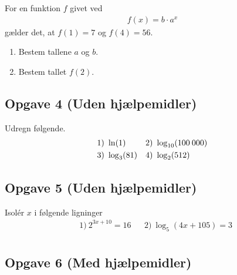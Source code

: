 \documentclass[12pt]{article}
\begin{document}
For en funktion $f$ givet ved 
\begin{align*}
	f(x) = b\cdot a^x
\end{align*}
gælder det, at $f(1) = 7$ og $f(4) = 56$.
\begin{enumerate}[label=\roman*)]
	\item Bestem tallene $a$ og $b$. 
	\item Bestem tallet $f(2)$.
\end{enumerate}

\subsection*{Opgave 4 (Uden hjælpemidler)}

Udregn følgende.
\begin{align*}
	&1) \   \ln(1)  &  &2) \ \log_{10}(100\hspace{0.8mm} 000)\\
	&3) \ \log_3(81)  &  &4) \ \log_{2}(512) 
\end{align*}

\subsection*{Opgave 5 (Uden hjælpemidler)}

Isolér $x$ i følgende ligninger
\begin{align*}
	&1) \ 2^{3x + 10} = 16 &&2) \ \log_5(4x + 105) = 3 \\
\end{align*}
\subsection*{Opgave 6 (Med hjælpemidler)}
\end{document}
